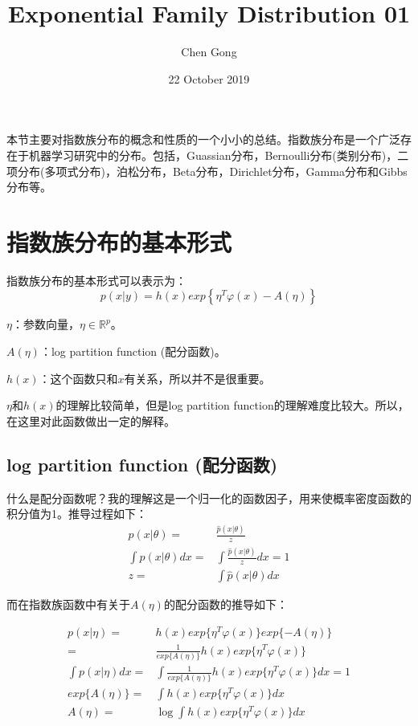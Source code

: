 \documentclass[a4paper]{article}
\title{Exponential Family Distribution 01}
\author{Chen Gong}
\date{22 October 2019}
\begin{document}
\maketitle

本节主要对指数族分布的概念和性质的一个小小的总结。指数族分布是一个广泛存在于机器学习研究中的分布。包括，Guassian分布，Bernoulli分布(类别分布)，二项分布(多项式分布)，泊松分布，Beta分布，Dirichlet分布，Gamma分布和Gibbs分布等。

\section{指数族分布的基本形式}
指数族分布的基本形式可以表示为：
\begin{equation}
    p(x|y)=h(x)exp\left\{ \eta^T\varphi(x)-A(\eta) \right\}
\end{equation}

$\eta$：参数向量，$\eta \in \mathbb{R}^p$。

$A(\eta)$：log partition function (配分函数)。

$h(x)$：这个函数只和$x$有关系，所以并不是很重要。

$\eta$和$h(x)$的理解比较简单，但是log partition function的理解难度比较大。所以，在这里对此函数做出一定的解释。

\subsection{log partition function (配分函数)}
什么是配分函数呢？我的理解这是一个归一化的函数因子，用来使概率密度函数的积分值为1。推导过程如下：
\begin{equation}
    \begin{split}
        p(x|\theta) =  & \frac{\hat{p}(x|\theta)}{z} \\
        \int p(x|\theta) dx = & \int \frac{\hat{p}(x|\theta)}{z}dx = 1 \\
        z = & \int \hat{p}(x|\theta)dx
    \end{split}
\end{equation}

而在指数族函数中有关于$A(\eta)$的配分函数的推导如下：

\begin{equation}
    \begin{split}
        p(x|\eta) = & h(x)exp\{ \eta^T\varphi(x)\}exp\{-A(\eta)\} \\
        = & \frac{1}{exp\{A(\eta)\}} h(x)exp\{ \eta^T\varphi(x)\}\\
        \int p(x|\eta) dx = & \int \frac{1}{exp\{A(\eta)\}} h(x)exp\{ \eta^T\varphi(x)\} dx = 1 \\ 
        exp\{A(\eta)\} = & \int h(x)exp\{ \eta^T\varphi(x)\} dx \\ 
        A(\eta) = & \log \int h(x)exp\{ \eta^T\varphi(x)\} dx
    \end{split}
\end{equation}
\end{document}
